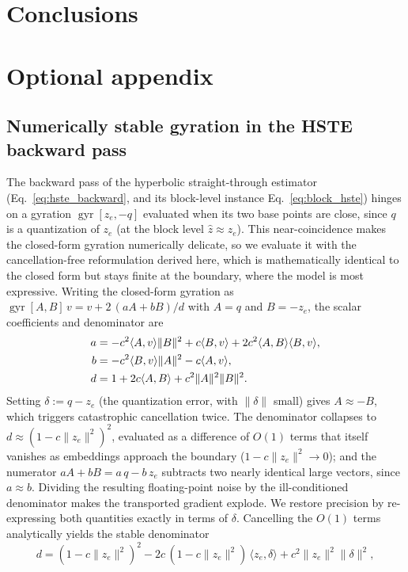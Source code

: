 \documentclass[12pt]{report}
\begin{document}
\chapter{Conclusions}


\appendix
\chapter{Optional appendix}

\section{Numerically stable gyration in the HSTE backward pass}
\label{app:gyration}
The backward pass of the hyperbolic straight-through estimator (Eq.~\ref{eq:hste_backward}, and its block-level instance Eq.~\ref{eq:block_hste}) hinges on a gyration $\operatorname{gyr}[z_e,-q]$ evaluated when its two base points are close, since $q$ is a quantization of $z_e$ (at the block level $\hat z\approx z_e$). This near-coincidence makes the closed-form gyration numerically delicate, so we evaluate it with the cancellation-free reformulation derived here, which is mathematically identical to the closed form but stays finite at the boundary, where the model is most expressive. Writing the closed-form gyration as $\operatorname{gyr}[A,B]\,v = v + 2\,(aA+bB)/d$ with $A=q$ and $B=-z_e$, the scalar coefficients and denominator are
\begin{align}
    a &= -c^2\langle A,v\rangle\|B\|^2 + c\langle B,v\rangle + 2c^2\langle A,B\rangle\langle B,v\rangle,\notag\\
    b &= -c^2\langle B,v\rangle\|A\|^2 - c\langle A,v\rangle,\notag\\
    d &= 1 + 2c\langle A,B\rangle + c^2\|A\|^2\|B\|^2 .
\end{align}
Setting $\delta := q - z_e$ (the quantization error, with $\|\delta\|$ small) gives $A\approx -B$, which triggers catastrophic cancellation twice. The denominator collapses to $d\approx(1-c\|z_e\|^2)^2$, evaluated as a difference of $O(1)$ terms that itself vanishes as embeddings approach the boundary ($1-c\|z_e\|^2\to 0$); and the numerator $aA+bB = a\,q - b\,z_e$ subtracts two nearly identical large vectors, since $a\approx b$. Dividing the resulting floating-point noise by the ill-conditioned denominator makes the transported gradient explode. We restore precision by re-expressing both quantities exactly in terms of $\delta$. Cancelling the $O(1)$ terms analytically yields the stable denominator
\begin{equation}
    \label{eq:gyr_d_stable}
    d = (1-c\|z_e\|^2)^2 - 2c\,(1-c\|z_e\|^2)\,\langle z_e,\delta\rangle + c^2\|z_e\|^2\|\delta\|^2,
\end{equation}
\end{document}
